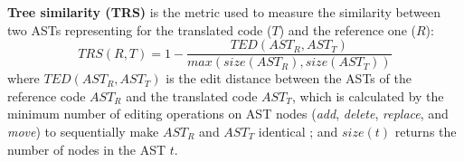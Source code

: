 \textbf{Tree similarity (TRS)} is the metric used to measure
the similarity between two ASTs representing for the translated code ($T$)
and the reference one ($R$):
$$TRS(R, T) = 1 -\frac{TED(AST_R, AST_T)}{max\left(size(AST_R),
  size(AST_T)\right)}$$ where $TED(AST_R, AST_T)$ is the edit
distance between the ASTs of the reference code $AST_R$ and the
translated code $AST_T$, which is calculated by the minimum number of
editing operations on AST nodes ({\em add}, {\em delete}, {\em
  replace}, and {\em move}) to sequentially make $AST_R$ and $AST_T$
identical \cite{oopsla10}; and $size(t)$ returns the number of
nodes in the AST $t$.
%
%
%

%

